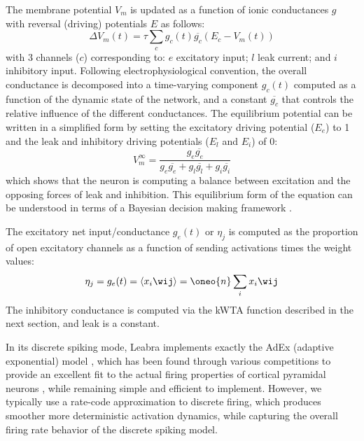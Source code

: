 The membrane potential $V_m$ is updated as a function of ionic conductances $g$ with reversal (driving) potentials $E$ as follows:
\begin{equation}
 \Delta V_m(t) = \tau \sum_c g_c(t) \overline{g_c} (E_c - V_m(t))
 \label{eq.vm}
\end{equation}
with 3 channels ($c$) corresponding to: $e$ excitatory input; $l$ leak current; and $i$ inhibitory input. Following electrophysiological convention, the overall conductance is decomposed into a time-varying component $g_c(t)$ computed as a function of the dynamic state of the network, and a constant $\overline{g_c}$ that controls the relative influence of the different conductances. The equilibrium potential can be written in a simplified form by setting the excitatory driving potential ($E_e$) to 1 and the leak and inhibitory driving potentials ($E_l$ and $E_i$) of 0:
\begin{equation}
 V_m^\infty = \frac{g_e \overline{g_e}} {g_e
  \overline{g_e} + g_l \overline{g_l} + g_i \overline{g_i}} 
\end{equation}
which shows that the neuron is computing a balance between excitation and the opposing forces of leak and inhibition. This equilibrium form of the equation can be understood in terms of a Bayesian decision making framework \cite{OReillyMunakata00}.

The excitatory net input/conductance $g_e(t)$ or $\eta_j$ is computed as the proportion of open excitatory channels as a function of sending activations times the weight values:
\begin{equation}
 \eta_j = g_e(t) = \langle x_i \wij \rangle = \oneo{n} \sum_i x_i \wij
 \label{eq.net_in_avg}
\end{equation}
The inhibitory conductance is computed via the kWTA function described in the next section, and leak is a constant.

In its discrete spiking mode, Leabra implements exactly the AdEx (adaptive exponential) model \cite{BretteGerstner05}, which has been found through various competitions to provide an excellent fit to the actual firing properties of cortical pyramidal neurons \cite{GerstnerNaud09}, while remaining simple and efficient to implement. However, we typically use a rate-code approximation to discrete firing, which produces smoother more deterministic activation dynamics, while capturing the overall firing rate behavior of the discrete spiking model.

